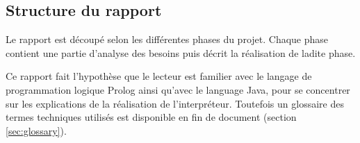 \documentclass[../report.tex]{subfiles}
\begin{document}
\subsection{Structure du rapport}
Le rapport est découpé selon les différentes phases du projet. Chaque phase contient une partie d'analyse des besoins puis décrit la réalisation de ladite phase.

Ce rapport fait l'hypothèse que le lecteur est familier avec le langage de programmation logique Prolog ainsi qu'avec le language Java, pour se concentrer sur les explications de la réalisation de l'interpréteur. Toutefois un glossaire des termes techniques utilisés est disponible en fin de document (section \ref{sec:glossary}).
\end{document}
